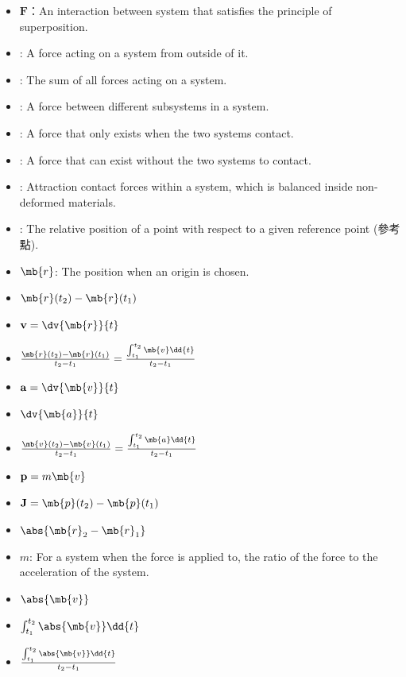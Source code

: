 \documentclass[a4paper,12pt]{article}
\begin{document}
\begin{itemize}
\item{} $\mathbf{F}$：An interaction between system that satisfies the principle of superposition.
\item{}: A force acting on a system from outside of it.
\item{}: The sum of all forces acting on a system.
\item{}: A force between different subsystems in a system.
\item{}: A force that only exists when the two systems contact.
\item{}: A force that can exist without the two systems to contact.
\item{}: Attraction contact forces within a system, which is balanced inside non-deformed materials.
\item{}: The relative position of a point with respect to a given reference point (參考點).
\item{} $\mb{r}$: The position when an origin is chosen.
\item{} $\mb{r}(t_2)-\mb{r}(t_1)$
\item{} $\mathbf{v}=\dv{\mb{r}}{t}$
\item{} $\frac{\mb{r}(t_2)-\mb{r}(t_1)}{t_2-t_1}=\frac{\int_{t_1}^{t_2}\mb{v}\dd{t}}{t_2-t_1}$
\item{} $\mathbf{a}=\dv{\mb{v}}{t}$
\item{} $\dv{\mb{a}}{t}$
\item{} $\frac{\mb{v}(t_2)-\mb{v}(t_1)}{t_2-t_1}=\frac{\int_{t_1}^{t_2}\mb{a}\dd{t}}{t_2-t_1}$
\item{} $\mathbf{p}=m\mb{v}$
\item{} $\mathbf{J}=\mb{p}(t_2)-\mb{p}(t_1)$
\end{itemize}
\begin{itemize}
\item{} $\abs{\mb{r}_2-\mb{r}_1}$
\item{} $m$: For a system when the force is applied to, the ratio of the force to the acceleration of the system.
\item{} $\abs{\mb{v}}$
\item{} $\int_{t_1}^{t_2}\abs{\mb{v}}\dd{t}$
\item{} $\frac{\int_{t_1}^{t_2}\abs{\mb{v}}\dd{t}}{t_2-t_1}$
\end{itemize}
\end{document}
